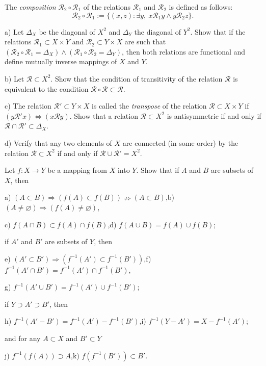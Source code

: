 \begin{exercise}
	The \textit{composition} $\mathcal{R}_2 \circ \mathcal{R}_1$ of the relations $\mathcal{R}_1$ and $\mathcal{R}_2$ is defined as follows:$$\mathcal{R}_2 \circ \mathcal{R}_1 := \{ (x,z):\exists y,~x \mathcal{R}_1 y \wedge y \mathcal{R}_2 z \}.$$
	
	a) Let $\Delta _X$ be the diagonal of $X^2$ and $\Delta _Y$ the diagonal of $Y^2$.  Show that if the relations $\mathcal{R}_1 \subset X \times Y$ and $\mathcal{R}_2 \subset Y \times X$ are such that $(\mathcal{R}_2 \circ \mathcal{R}_1 = \Delta _X) \wedge (\mathcal{R}_1 \circ \mathcal{R}_2 = \Delta _Y)$, then both relations are functional and define mutually inverse mappings of $X$ and $Y$.
	
	b) Let $\mathcal{R} \subset X^2$. Show that the condition of transitivity of the relation $\mathcal{R}$ is equivalent to the condition $\mathcal{R} \circ \mathcal{R} \subset \mathcal{R}$. 
	
	c) The relation $\mathcal{R}' \subset Y \times X$ is called the \textit{transpose} of the relation $\mathcal{R} \subset X \times Y$ if $(y\mathcal{R}' x) \Leftrightarrow (x\mathcal{R} y)$. Show that a relation $\mathcal{R} \subset X^2$ is antisymmetric if and only if $\mathcal{R} \cap \mathcal{R}' \subset \Delta _X$. 
	
	d) Verify that any two elements of $X$ are connected (in some order) by the relation $\mathcal{R} \subset X^2$ if and only if $\mathcal{R} \cup \mathcal{R}' = X^2$.
\end{exercise}

\begin{exercise}
	Let $f:X \to Y$ be a mapping from $X$ into $Y$. Show that if $A$ and $B$ are subsets of $X$, then
	
	a) $(A \subset B) \Rightarrow (f(A) \subset f(B)) \nRightarrow (A \subset B)$,\qquad b) $(A \neq \varnothing) \Rightarrow (f(A) \neq \varnothing)$,
	
	c) $f(A \cap B) \subset f(A) \cap f(B)$,\qquad d) $f(A \cup B) = f(A) \cup f(B)$;
	
	\noindent
	if $A'$ and $B'$ are subsets of $Y$, then
	
	e) $(A' \subset B') \Rightarrow (f^{-1}(A') \subset f^{-1}(B'))$,\qquad f) $f^{-1}(A' \cap B') = f^{-1}(A') \cap f^{-1}(B')$,
	
	g) $f^{-1}(A' \cup B') = f^{-1}(A') \cup f^{-1}(B')$;
	
	\noindent
	if $Y \supset A' \supset B'$, then
	
	h) $f^{-1}(A'-B') = f^{-1}(A') - f^{-1}(B')$,\qquad i) $f^{-1}(Y-A') = X-f^{-1}(A')$;
	
	\noindent
	and for any $A \subset X$ and $B' \subset Y$
	
	j) $f^{-1}(f(A)) \supset A$,\qquad k) $f(f^{-1}(B')) \subset B'$.
\end{exercise}

